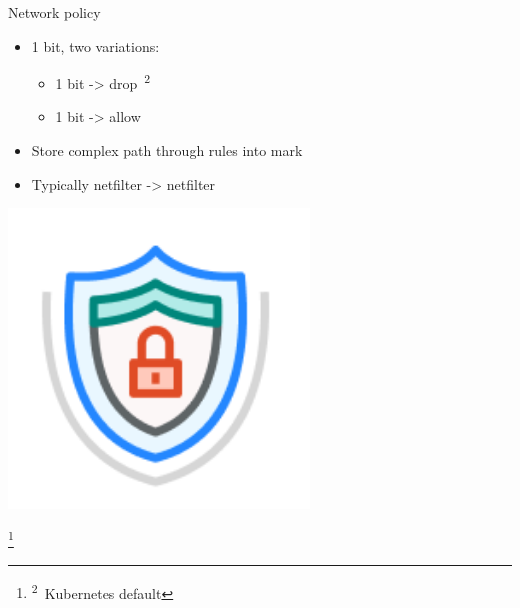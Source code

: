 \documentclass[black,white,aspectratio=169]{beamer}
\newcommand\blfootnote[1]{%
  \begingroup
  \renewcommand\thefootnote{}\footnote{#1}%
  \addtocounter{footnote}{-1}%
  \endgroup
}
\DeclareRobustCommand{\#}{\adjustbox{valign=B,totalheight=.57\baselineskip}{\oldhash}}%
\begin{document}
    \begin{frame}{Network policy}
        \begin{table}
            \begin{subtable}[l]{0.7\textwidth}
        \begin{itemize}
            \item 1 bit, two variations:~\smallskip
            \begin{itemize}
                \item 1 bit -> drop~\textsuperscript{2}~\smallskip
                \item 1 bit -> allow~\medskip %
            \end{itemize}
            \item Store complex path through rules into mark~\medskip
            \item Typically netfilter -> netfilter~\medskip
        \end{itemize}
            \end{subtable}
            \begin{subtable}[r]{0.2\textwidth}
                \includegraphics[width=0.6\textwidth]{policy.png}
            \end{subtable}
        \end{table}
        \blfootnote{\textsuperscript{2}~Kubernetes default}
    \end{frame}
\end{document}
